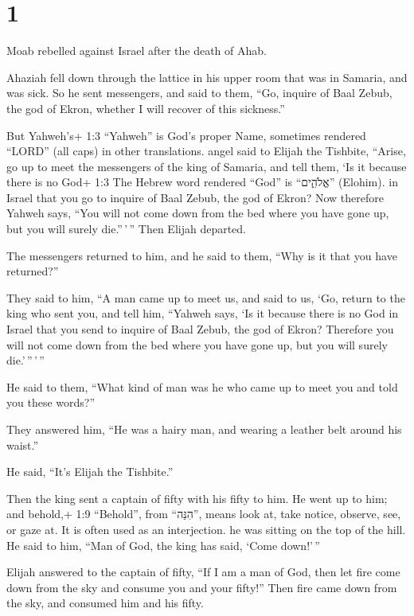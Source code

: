 \hypertarget{section}{%
\section{1}\label{section}}

 Moab rebelled against Israel after the death of Ahab.

 Ahaziah fell down through the lattice in his upper room
that was in Samaria, and was sick. So he sent messengers, and said to
them, ``Go, inquire of Baal Zebub, the god of Ekron, whether I will
recover of this sickness.''

 But Yahweh's+ 1:3 ``Yahweh'' is God's proper Name,
sometimes rendered ``LORD'' (all caps) in other translations. angel said
to Elijah the Tishbite, ``Arise, go up to meet the messengers of the
king of Samaria, and tell them, `Is it because there is no God+ 1:3 The
Hebrew word rendered ``God'' is ``אֱלֹהִ֑ים'' (Elohim). in Israel that
you go to inquire of Baal Zebub, the god of Ekron?  Now
therefore Yahweh says, ``You will not come down from the bed where you
have gone up, but you will surely die.''\,'\,'' Then Elijah departed.

 The messengers returned to him, and he said to them, ``Why
is it that you have returned?''

 They said to him, ``A man came up to meet us, and said to
us, `Go, return to the king who sent you, and tell him, ``Yahweh says,
`Is it because there is no God in Israel that you send to inquire of
Baal Zebub, the god of Ekron? Therefore you will not come down from the
bed where you have gone up, but you will surely die.'\,''\,'\,''

 He said to them, ``What kind of man was he who came up to
meet you and told you these words?''

 They answered him, ``He was a hairy man, and wearing a
leather belt around his waist.''

He said, ``It's Elijah the Tishbite.''

 Then the king sent a captain of fifty with his fifty to
him. He went up to him; and behold,+ 1:9 ``Behold'', from ``הִנֵּה'',
means look at, take notice, observe, see, or gaze at. It is often used
as an interjection. he was sitting on the top of the hill. He said to
him, ``Man of God, the king has said, `Come down!'\,''

 Elijah answered to the captain of fifty, ``If I am a man
of God, then let fire come down from the sky and consume you and your
fifty!'' Then fire came down from the sky, and consumed him and his
fifty.

